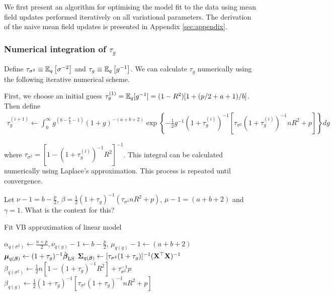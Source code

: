 \documentclass{amsart}[12pt]
\newcommand{\mgc}[1]{{\color{blue}#1}}
\begin{document}
We first present an algorithm for optimising the model fit to the data using mean field updates performed
iteratively on all variational parameters. The derivation of the naive mean field updates is presented in
Appendix \ref{sec:appendix}.

\subsubsection{Numerical integration of $\tau_g$}
\label{sec:num_int}

Define $\tau_{\sigma^2} \equiv \mathbb{E}_q \left[ \sigma^{-2} \right]$ and $\tau_g \equiv \mathbb{E}_q \left[ g^{-1}
\right]$. We can calculate $\tau_g$ numerically using the following iterative numerical scheme.

First, we choose an initial guess $\tau_g^{(1)} = \mathbb{E}_q [g^{-1}] = (1 - R^2) [1 + (p / 2 + a + 1)/b]$. Then
define
\begin{align*}
	\tau_g^{(i+1)} \leftarrow \int_0^\infty g^{\left(b - \frac{p}{2} - 1\right)}                                   
	(1 + g)^{- (a + b + 2)}                                                                                        
	\exp \left \{- \frac{1}{2} g^{-1}  (1 + \tau_g^{(i)})^{-1} [\tau_{\sigma^2} (1 + \tau_g^{(i)})^{-1} n R^2 + p] 
	\right \} dg                                                                                                   
\end{align*}

\noindent where $\tau_{\sigma^2} = [1 - (1 + \tau_g^{(i)})^{-1} R^2]^{-1}$. This integral can be calculated
numerically using Laplace's approximation. This process is repeated until convergence.

Let $\nu - 1 = b - \frac{p}{2}$, 
$\beta = \frac{1}{2} (1 + \tau_g)^{-1} (\tau_{\sigma^2} n R^2 + p)$, 
$\mu - 1 = (a + b + 2)$ and $\gamma = 1$. \mgc{What is the context for this?}

\begin{algorithm}
	\caption{Fit VB approximation of linear model}
	\label{alg:algorithm_one}
	\begin{algorithmic}
		\REQUIRE $\alpha_{q(\sigma^2)} \leftarrow \frac{n + p}{2}, \nu_{q(g)} - 1 \leftarrow b - \frac{p}{2}$, $\mu_{q(g)} - 1 \leftarrow (a + b + 2)$
		\STATE ${\boldsymbol \mu}_{q({\boldsymbol \beta})} \leftarrow (1 + \tau_g)^{-1} \hat{{\boldsymbol \beta}}_{\text{LS}}$
		\STATE ${\boldsymbol \Sigma}_{q({\boldsymbol \beta})} \leftarrow [\tau_{\sigma^2} (1 + \tau_g)]^{-1} ({\bf X}^\top {\bf X})^{-1}$
		\STATE $\beta_{q(\sigma^2)} \leftarrow  \frac{1}{2} {n[1 - (1 + \tau_g)^{-1} R^2] + \tau_{\sigma^2}^{-1} p}$
		\STATE $\beta_{q(g)} \leftarrow \frac{1}{2} (1 + \tau_g)^{-1} [\tau_{\sigma^2} (1 + \tau_g)^{-1} n R^2 + p]$
		\ENDWHILE
	\end{algorithmic}
\end{algorithm}
\end{document}
